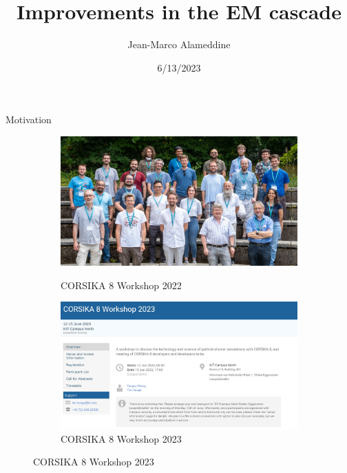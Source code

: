 \documentclass[aspectratio=1610, 9pt]{beamer}
\title{Improvements in the EM cascade}
\author[jean-marco.alameddine@tu-dortmund.de]{Jean-Marco Alameddine}
\institute[]{CORSIKA 8 Workshop 2023}
\date[]{6/13/2023}
\begin{document}
\maketitle

\begin{frame}{Motivation}

\begin{figure}
    \begin{figure}[ht]
        \begin{minipage}[b]{0.4\linewidth}
            \centering
            \includegraphics[width=\textwidth]{images/photo_2022.jpg}
            \caption*{CORSIKA 8 Workshop 2022}
            \label{fig:a}
        \end{minipage}
        \begin{minipage}[t]{0.15\linewidth}
          \vspace{-25mm}
          \centering
          \Huge\textbf{\rightarrow}
        \end{minipage}        
        \begin{minipage}[b]{0.4\linewidth}
            \centering
            \includegraphics[width=\textwidth]{images/photo_2023.jpg}
            \caption*{CORSIKA 8 Workshop 2023}
            \label{fig:b}
        \end{minipage}
    \end{figure}
\end{figure}


\end{frame}
\end{document}
